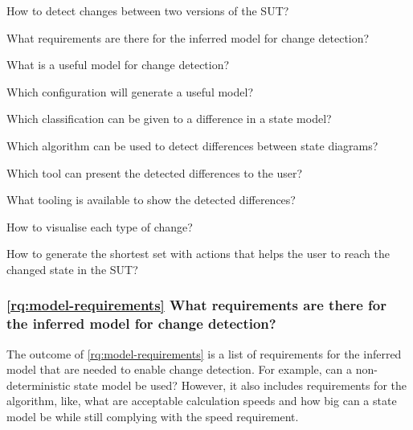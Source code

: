 \begin{questions}
    \item How to detect changes between two versions of the SUT? \label{rq:detect-changes}
    \begin{questions}
        \item What requirements are there for the inferred model for change detection? \label{rq:model-requirements}
        \item What is a useful model for change detection? \label{rq:useful-model}
        \item Which configuration will generate a useful model? \label{rq:gen-useful-model}
        \item Which classification can be given to a difference in a state model? \label{rq:classifications} 
        \item Which algorithm can be used to detect differences between state diagrams? \label{rq:difference-algorithm}
    \end{questions}

    \item Which tool can present the detected differences to the user? \label{rq:diff-visualisation}
    \begin{questions}
        \item What tooling is available to show the detected differences? \label{rq:tooling}
        \item How to visualise each type of change? \label{rq:type-visualisation}
        \item How to generate the shortest set with actions that helps the user to reach the changed state in the SUT? \label{rq:shortest-set}    
    \end{questions}

\end{questions}

\subsubsection{\ref{rq:model-requirements} What requirements are there for the inferred model for change detection?}
The outcome of \ref{rq:model-requirements} is a list of requirements for the inferred model that are needed to enable change detection. For example, can a non-deterministic state model be used? However, it also includes requirements for the algorithm, like, what are acceptable calculation speeds and how big can a state model be while still complying with the speed requirement. 


